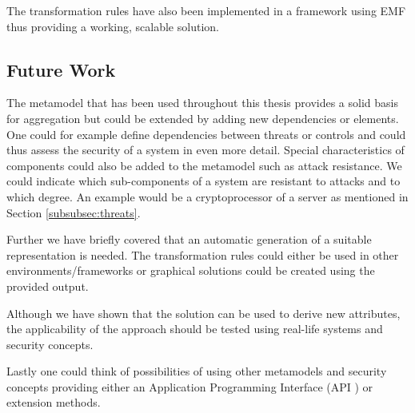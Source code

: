 The transformation rules have also been implemented in a framework using EMF thus providing a working, scalable solution.  

\subsection{Future Work}

The metamodel that has been used throughout this thesis provides a solid basis for aggregation but could be extended by adding new dependencies or elements. One could for example define dependencies between threats or controls and could thus assess the security of a system in even more detail. Special characteristics of components could also be added to the metamodel such as attack resistance. We could indicate which sub-components of a system are resistant to attacks and to which degree. An example would be a cryptoprocessor of a server as mentioned in Section \ref{subsubsec:threats}.  

Further we have briefly covered that an automatic generation of a suitable representation is needed. The transformation rules could either be used in other environments/frameworks or graphical solutions could be created using the provided output.

Although we have shown that the solution can be used to derive new attributes, the applicability of the approach should be tested using real-life systems and security concepts.

Lastly one could think of possibilities of using other metamodels and security concepts providing either an Application Programming Interface (API ) or extension methods.